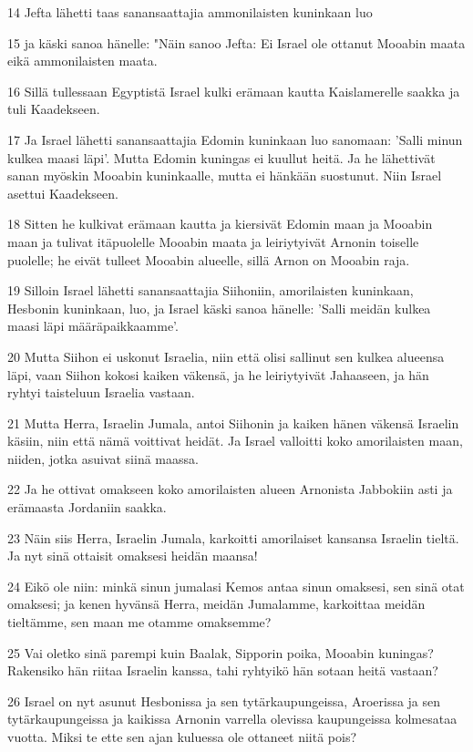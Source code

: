 \par 14 Jefta lähetti taas sanansaattajia ammonilaisten kuninkaan luo
\par 15 ja käski sanoa hänelle: "Näin sanoo Jefta: Ei Israel ole ottanut Mooabin maata eikä ammonilaisten maata.
\par 16 Sillä tullessaan Egyptistä Israel kulki erämaan kautta Kaislamerelle saakka ja tuli Kaadekseen.
\par 17 Ja Israel lähetti sanansaattajia Edomin kuninkaan luo sanomaan: 'Salli minun kulkea maasi läpi'. Mutta Edomin kuningas ei kuullut heitä. Ja he lähettivät sanan myöskin Mooabin kuninkaalle, mutta ei hänkään suostunut. Niin Israel asettui Kaadekseen.
\par 18 Sitten he kulkivat erämaan kautta ja kiersivät Edomin maan ja Mooabin maan ja tulivat itäpuolelle Mooabin maata ja leiriytyivät Arnonin toiselle puolelle; he eivät tulleet Mooabin alueelle, sillä Arnon on Mooabin raja.
\par 19 Silloin Israel lähetti sanansaattajia Siihoniin, amorilaisten kuninkaan, Hesbonin kuninkaan, luo, ja Israel käski sanoa hänelle: 'Salli meidän kulkea maasi läpi määräpaikkaamme'.
\par 20 Mutta Siihon ei uskonut Israelia, niin että olisi sallinut sen kulkea alueensa läpi, vaan Siihon kokosi kaiken väkensä, ja he leiriytyivät Jahaaseen, ja hän ryhtyi taisteluun Israelia vastaan.
\par 21 Mutta Herra, Israelin Jumala, antoi Siihonin ja kaiken hänen väkensä Israelin käsiin, niin että nämä voittivat heidät. Ja Israel valloitti koko amorilaisten maan, niiden, jotka asuivat siinä maassa.
\par 22 Ja he ottivat omakseen koko amorilaisten alueen Arnonista Jabbokiin asti ja erämaasta Jordaniin saakka.
\par 23 Näin siis Herra, Israelin Jumala, karkoitti amorilaiset kansansa Israelin tieltä. Ja nyt sinä ottaisit omaksesi heidän maansa!
\par 24 Eikö ole niin: minkä sinun jumalasi Kemos antaa sinun omaksesi, sen sinä otat omaksesi; ja kenen hyvänsä Herra, meidän Jumalamme, karkoittaa meidän tieltämme, sen maan me otamme omaksemme?
\par 25 Vai oletko sinä parempi kuin Baalak, Sipporin poika, Mooabin kuningas? Rakensiko hän riitaa Israelin kanssa, tahi ryhtyikö hän sotaan heitä vastaan?
\par 26 Israel on nyt asunut Hesbonissa ja sen tytärkaupungeissa, Aroerissa ja sen tytärkaupungeissa ja kaikissa Arnonin varrella olevissa kaupungeissa kolmesataa vuotta. Miksi te ette sen ajan kuluessa ole ottaneet niitä pois?
